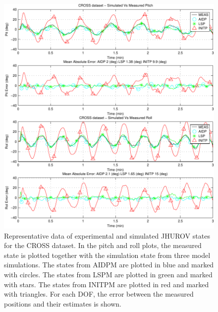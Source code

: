 \begin{center}
\begin{figure}[htbp]
  \begin{center}
    \includegraphics[width=6in]{./chUV_AID/images/SE3_crossPos}
  \end{center}
  \caption{ Representative data of experimental and simulated
    \ac{JHUROV} states for the \ac{CROSS} dataset. In the pitch and
    roll plots, the measured state is plotted together with the
    simulation state from three model simulations. The states from
    \ac{AIDPM} are plotted in blue and marked with circles.  The
    states from \ac{LSPM} are plotted in green and marked with stars.
    The states from \ac{INITPM} are plotted in red and marked with
    triangles.  For each \ac{DOF}, the error between the measured
    positions and their estimates is shown.  }
  \label{chUV_AID.fig.SE3_crossPos}
\end{figure}
\end{center}


